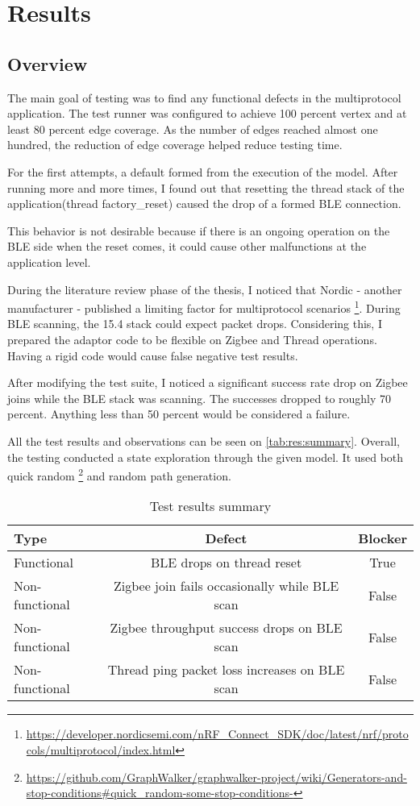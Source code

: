\chapter{Results}
\label{chap:results}
\section{Overview}
The main goal of testing was to find any functional defects in the multiprotocol application. The test runner was configured to achieve 100 percent vertex and at least 80 percent edge coverage. As the number of edges reached almost one hundred, the reduction of edge coverage helped reduce testing time.


For the first attempts, a default formed from the execution of the model. After running more and more times, I found out that resetting the thread stack of the application(thread factory\_reset) caused the drop of a formed BLE connection.


This behavior is not desirable because if there is an ongoing operation on the BLE side when the reset comes, it could cause other malfunctions at the application level.


During the literature review phase of the thesis, I noticed that Nordic - another manufacturer - published a limiting factor for multiprotocol scenarios \footnote{\url{https://developer.nordicsemi.com/nRF_Connect_SDK/doc/latest/nrf/protocols/multiprotocol/index.html}}. During BLE scanning, the 15.4 stack could expect packet drops. Considering this, I prepared the adaptor code to be flexible on Zigbee and Thread operations. Having a rigid code would cause false negative test results.


After modifying the test suite, I noticed a significant success rate drop on Zigbee joins while the BLE stack was scanning. The successes dropped to roughly 70 percent. Anything less than 50 percent would be considered a failure.

All the test results and observations can be seen on \autoref{tab:res:summary}.
Overall, the testing conducted a state exploration through the given model. It used both quick random
\footnote{\url{https://github.com/GraphWalker/graphwalker-project/wiki/Generators-and-stop-conditions\#quick_random-some-stop-conditions-}}
and random path generation.

\begin{table}
    \centering
    \begin{tabular}{ l c c }
        \toprule
        Type           & Defect                                        & Blocker \\
        \midrule
        Functional     & BLE drops on thread reset                     & True    \\
        Non-functional & Zigbee join fails occasionally while BLE scan & False   \\
        Non-functional & Zigbee throughput success drops on BLE scan   & False   \\
        Non-functional & Thread ping packet loss increases on BLE scan & False   \\
        \bottomrule
    \end{tabular}
    \caption{Test results summary}
    \label{tab:res:summary}
\end{table}